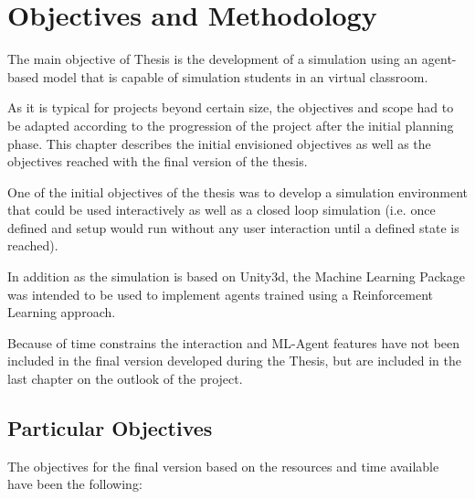 \chapter{Objectives and Methodology}
The main objective of Thesis is the development of a simulation using an
agent-based model that is capable of simulation students in an virtual classroom.

\bb

As it is typical for projects beyond certain size, the objectives and scope had to
be adapted according to the progression of the project after the initial planning phase.
This chapter describes the initial envisioned objectives as well as the objectives
reached with the final version of the thesis.

One of the initial objectives of the thesis was to develop a simulation environment that
could be used interactively as well as a closed loop simulation (i.e. once defined
and setup would run without any user interaction until a defined state is reached).

In addition as the simulation is based on Unity3d, the Machine Learning Package
was intended to be used to implement agents trained using a Reinforcement Learning approach.

Because of time constrains the interaction and ML-Agent features have not been included
in the final version developed during the Thesis, but are included in the last chapter
on the outlook of the project.

\section{Particular Objectives}

The objectives for the final version based on the resources and time available
have been the following:

